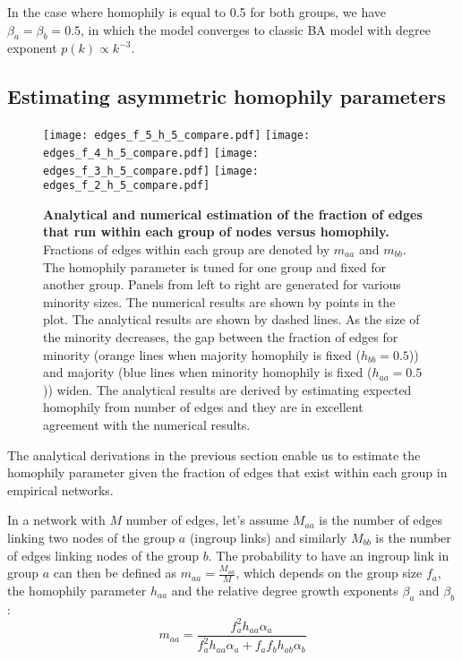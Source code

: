 In the case where homophily is equal to 0.5 for both groups, we have  $\beta_{a} = \beta_{b} = 0.5$, in which the model converges to classic BA model with degree exponent $p(k) \propto k^{-3}$.  

\subsection{Estimating asymmetric homophily parameters}

\begin{figure*}[]
\centering
\texttt{[image: edges\_f\_5\_h\_5\_compare.pdf]}
\texttt{[image: edges\_f\_4\_h\_5\_compare.pdf]}
\texttt{[image: edges\_f\_3\_h\_5\_compare.pdf]}
\texttt{[image: edges\_f\_2\_h\_5\_compare.pdf]}

\caption{\textbf{Analytical and numerical estimation of the fraction of edges that run within each group of nodes versus homophily.} Fractions of edges within each group are denoted by $m_{aa}$ and $m_{bb}$. The homophily parameter is tuned for one group and fixed for another group.  Panels from left to right are generated for various minority sizes. The numerical results are shown by points in the plot. The analytical results are shown by dashed lines. As the size of the minority decreases, the gap between the fraction of edges for minority (orange lines when majority homophily is fixed ($h_{bb} = 0.5$)) and majority (blue lines when minority homophily is fixed ($h_{aa} = 0.5$)) widen.
The analytical results are derived by estimating expected homophily from number of edges and they are in excellent agreement with the numerical results. }
\label{fig:analytical_edges}
\end{figure*}


The analytical derivations in the previous section enable us to estimate the homophily parameter given the fraction of edges that exist within each group in empirical networks. %


In a network with $M$ number of edges, let's assume $M_{aa}$ is the number of edges linking two nodes of the group $a$  (ingroup links) and similarly $M_{bb}$ is the number of edges linking nodes of the group $b$. The probability to have an ingroup link in group $a$ can then be defined as $m_{aa} = \frac{M_{aa}}{M}$, which depends on the group size $f_a$, the homophily parameter $h_{aa}$ and the relative degree growth exponents $\beta_{a}$ and $\beta_{b}$:
\begin{equation}
m_{aa} = \frac{f_{a}^2 h_{aa}\alpha_{a}}{f_{a}^2 h_{aa}\alpha_{a} + f_{a} f_{b} h_{ab}\alpha_{b}}
\end{equation}


